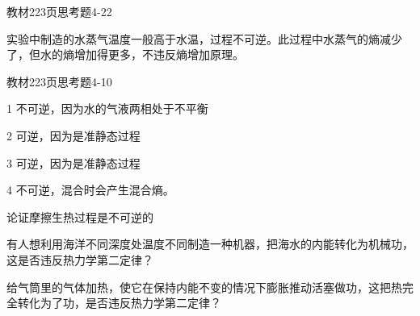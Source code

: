 \documentclass[CJK]{beamer}
\begin{document}
\begin{frame}
  \bch
  教材223页思考题4-22
  \ech
\end{frame}


\begin{frame}
  \bch
  实验中制造的水蒸气温度一般高于水温，过程不可逆。此过程中水蒸气的熵减少了，但水的熵增加得更多，不违反熵增加原理。
  \ech
\end{frame}

\begin{frame}
  \bch
  教材223页思考题4-10
  \ech
\end{frame}


\begin{frame}
  \bch
  \bitem
\item[1]{不可逆，因为水的气液两相处于不平衡}
\item[2]{可逆，因为是准静态过程}
\item[3]{可逆，因为是准静态过程}
\item[4]{不可逆，混合时会产生混合熵。}
  \eitem
  \ech
\end{frame}




\begin{frame}
\bch


\bitem
\item{论证摩擦生热过程是不可逆的}
\eitem

\ech
\end{frame}

\begin{frame}
\bch


\bitem
\item{有人想利用海洋不同深度处温度不同制造一种机器，把海水的内能转化为机械功，这是否违反热力学第二定律？}
\eitem

\ech
\end{frame}


\begin{frame}
\bch


\bitem
\item{给气筒里的气体加热，使它在保持内能不变的情况下膨胀推动活塞做功，这把热完全转化为了功，是否违反热力学第二定律？}
\eitem
\ech
\end{frame}
\end{document}
